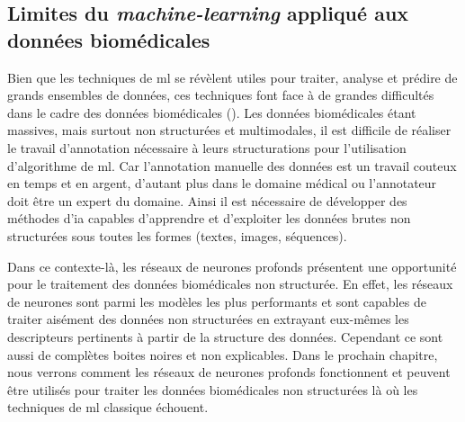 \subsection{Limites du \textit{machine-learning} appliqué aux données biomédicales}
Bien que les techniques de \gls{ml} se révèlent utiles pour traiter, analyse et prédire de grands ensembles de données, ces techniques font face à de grandes difficultés dans le cadre des données biomédicales (\cite{martinez-garcia_data_2022}). Les données biomédicales étant massives, mais surtout non structurées et multimodales, il est difficile de réaliser le travail d'annotation nécessaire à leurs structurations pour l'utilisation d'algorithme de \gls{ml}. Car l'annotation manuelle des données est un travail couteux en temps et en argent, d'autant plus dans le domaine médical ou l'annotateur doit être un expert du domaine. Ainsi il est nécessaire de développer des méthodes d'\gls{ia} capables d'apprendre et d'exploiter les données brutes non structurées sous toutes les formes (textes, images, séquences).

Dans ce contexte-là, les réseaux de neurones profonds présentent une opportunité pour le traitement des données biomédicales non structurée. En effet, les réseaux de neurones sont parmi les modèles les plus performants et sont capables de traiter aisément des données non structurées en extrayant eux-mêmes les descripteurs pertinents à partir de la structure des données. Cependant ce sont aussi de complètes boites noires et non explicables. Dans le prochain chapitre, nous verrons comment les réseaux de neurones profonds fonctionnent et peuvent être utilisés pour traiter les données biomédicales non structurées là où les techniques de \gls{ml} classique échouent.